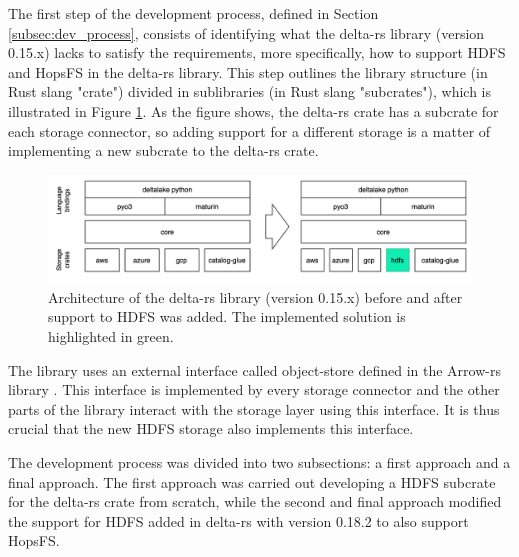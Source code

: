 
The first step of the development process, defined in Section \ref{subsec:dev_process}, consists of identifying what the delta-rs library (version 0.15.x) lacks  to satisfy the requirements, more specifically, how to support \gls{HDFS} and \gls{HopsFS} in the delta-rs \cite{DeltaioDeltars2024} library. This step outlines the library structure (in Rust slang "crate") divided in sublibraries (in Rust slang "subcrates"), which is illustrated in Figure \ref{fig:delta-rs_schema}. As the figure shows, the delta-rs crate has a subcrate for each storage connector, so adding support for a different storage is a matter of implementing a new subcrate to the delta-rs crate.

\begin{figure}[!ht]
    \begin{center}
      \includegraphics[width=\textwidth]{figures/4-implementation/delta-rs_schema.png}
    \caption{Architecture of the delta-rs library (version 0.15.x) before and after support to \gls{HDFS} was added. The implemented solution is highlighted in green.}
    \label{fig:delta-rs_schema}
    \end{center}
\end{figure}

The library uses an external interface called object-store defined in the Arrow-rs library \cite{ArrowrsObject_storeREADMEmd}. This interface is implemented by every storage connector and the other parts of the library interact with the storage layer using this interface. It is thus crucial that the new \gls{HDFS} storage also implements this interface.

The development process was divided into two subsections: a first approach and a final approach. The first approach was carried out developing a \gls{HDFS} subcrate for the delta-rs crate from scratch, while the second and final approach modified the support for \gls{HDFS} added in delta-rs with version 0.18.2 to also support \gls{HopsFS}.


